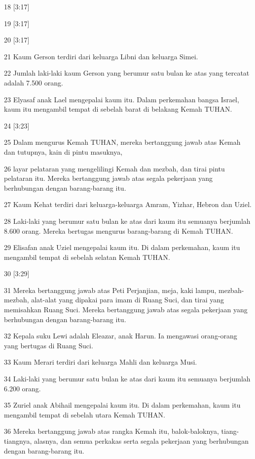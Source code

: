\par 18 [3:17]
\par 19 [3:17]
\par 20 [3:17]
\par 21 Kaum Gerson terdiri dari keluarga Libni dan keluarga Simei.
\par 22 Jumlah laki-laki kaum Gerson yang berumur satu bulan ke atas yang tercatat adalah 7.500 orang.
\par 23 Elyasaf anak Lael mengepalai kaum itu. Dalam perkemahan bangsa Israel, kaum itu mengambil tempat di sebelah barat di belakang Kemah TUHAN.
\par 24 [3:23]
\par 25 Dalam mengurus Kemah TUHAN, mereka bertanggung jawab atas Kemah dan tutupnya, kain di pintu masuknya,
\par 26 layar pelataran yang mengelilingi Kemah dan mezbah, dan tirai pintu pelataran itu. Mereka bertanggung jawab atas segala pekerjaan yang berhubungan dengan barang-barang itu.
\par 27 Kaum Kehat terdiri dari keluarga-keluarga Amram, Yizhar, Hebron dan Uziel.
\par 28 Laki-laki yang berumur satu bulan ke atas dari kaum itu semuanya berjumlah 8.600 orang. Mereka bertugas mengurus barang-barang di Kemah TUHAN.
\par 29 Elisafan anak Uziel mengepalai kaum itu. Di dalam perkemahan, kaum itu mengambil tempat di sebelah selatan Kemah TUHAN.
\par 30 [3:29]
\par 31 Mereka bertanggung jawab atas Peti Perjanjian, meja, kaki lampu, mezbah-mezbah, alat-alat yang dipakai para imam di Ruang Suci, dan tirai yang memisahkan Ruang Suci. Mereka bertanggung jawab atas segala pekerjaan yang berhubungan dengan barang-barang itu.
\par 32 Kepala suku Lewi adalah Eleazar, anak Harun. Ia mengawasi orang-orang yang bertugas di Ruang Suci.
\par 33 Kaum Merari terdiri dari keluarga Mahli dan keluarga Musi.
\par 34 Laki-laki yang berumur satu bulan ke atas dari kaum itu semuanya berjumlah 6.200 orang.
\par 35 Zuriel anak Abihail mengepalai kaum itu. Di dalam perkemahan, kaum itu mengambil tempat di sebelah utara Kemah TUHAN.
\par 36 Mereka bertanggung jawab atas rangka Kemah itu, balok-baloknya, tiang-tiangnya, alasnya, dan semua perkakas serta segala pekerjaan yang berhubungan dengan barang-barang itu.
